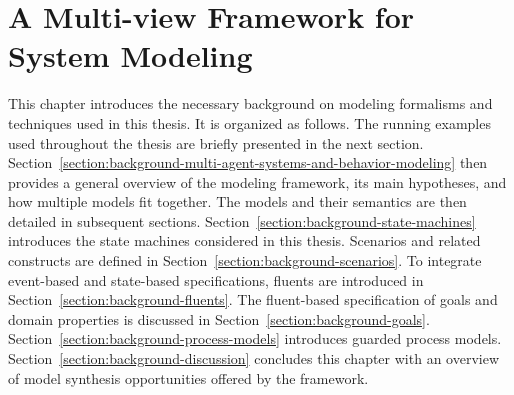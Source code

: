 \chapter{A Multi-view Framework for System Modeling\label{chapter:framework}}

This chapter introduces the necessary background on modeling formalisms and techniques used in this thesis. It is organized as follows. The running examples used throughout the thesis are briefly presented in the next section. Section~\ref{section:background-multi-agent-systems-and-behavior-modeling} then provides a general overview of the modeling framework, its main hypotheses, and how multiple models fit together. The models and their semantics are then detailed in subsequent sections. Section~\ref{section:background-state-machines} introduces the state machines considered in this thesis. Scenarios and related constructs are defined in Section~\ref{section:background-scenarios}. To integrate event-based and state-based specifications, fluents are introduced in Section~\ref{section:background-fluents}. The fluent-based specification of goals and domain properties is discussed in Section~\ref{section:background-goals}. Section~\ref{section:background-process-models} introduces guarded process models. Section~\ref{section:background-discussion} concludes this chapter with an overview of model synthesis opportunities offered by the framework.










